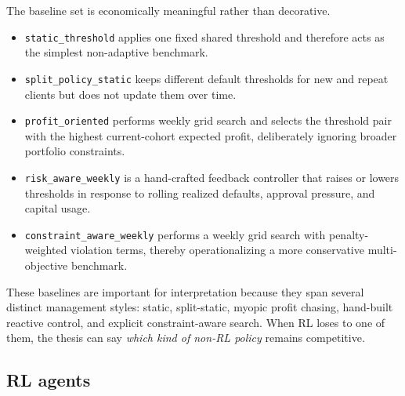 \documentclass[12pt,a4paper]{article}
\begin{document}
The baseline set is economically meaningful rather than decorative.
\begin{itemize}[leftmargin=*]
    \item \texttt{static\_threshold} applies one fixed shared threshold and therefore acts as the simplest non-adaptive benchmark.
    \item \texttt{split\_policy\_static} keeps different default thresholds for new and repeat clients but does not update them over time.
    \item \texttt{profit\_oriented} performs weekly grid search and selects the threshold pair with the highest current-cohort expected profit, deliberately ignoring broader portfolio constraints.
    \item \texttt{risk\_aware\_weekly} is a hand-crafted feedback controller that raises or lowers thresholds in response to rolling realized defaults, approval pressure, and capital usage.
    \item \texttt{constraint\_aware\_weekly} performs a weekly grid search with penalty-weighted violation terms, thereby operationalizing a more conservative multi-objective benchmark.
\end{itemize}

These baselines are important for interpretation because they span several distinct management styles: static, split-static, myopic profit chasing, hand-built reactive control, and explicit constraint-aware search. When RL loses to one of them, the thesis can say \emph{which kind of non-RL policy} remains competitive.

\subsection{RL agents}
\end{document}
